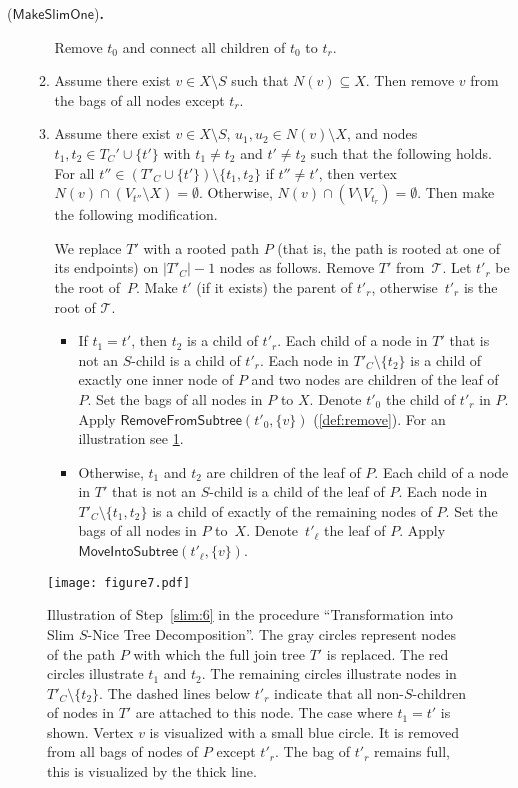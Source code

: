 \documentclass[a4paper,UKenglish,cleveref, autoref, thm-restate, numberwithinsect]{lipics-v2021}
\newcounter{modification}
\newenvironment{modification}[1][]{\refstepcounter{modification}\renewcommand{\arraystretch}{.6}
\begin{center}
\begin{mdframed}[nobreak=true]{\normalsize\sffamily{\bfseries Modification~\themodification} (#1){\bfseries .}}

\vspace{.5ex}
\begin{normalsize}
}
{
\end{normalsize}
\end{mdframed}
\end{center}
}
\newcommand{\MoveIntoSubtree}{\mathsf{MoveIntoSubtree}}
\newcommand{\RemoveFromSubtree}{\mathsf{RemoveFromSubtree}}
\newcommand{\MakeSlim}{\mathsf{MakeSlimOne}}
\begin{document}
\begin{modification}[$\MakeSlim$]
\begin{enumerate}
\begin{enumerate}
Remove $t_0$ and connect all children of $t_0$ to $t_r$.
\label{slim:6a}
\item Assume there exist $v\in X\setminus S$ such that $N(v)\subseteq X$. Then remove $v$ from the bags of all nodes except $t_r$.\label{slim:6aa}
\item Assume there exist $v\in X\setminus S$, $u_1,u_2\in N(v)\setminus X$, and nodes $t_1,t_2\in T_C'\cup\{t'\}$ with $t_1\neq t_2$ and $t'\neq t_2$ such that the following holds.
For all $t''\in (T'_C\cup\{t'\})\setminus\{t_1,t_2\}$ if $t''\neq t'$, then vertex $N(v)\cap (V_{t''}\setminus X)=\emptyset$. Otherwise, $N(v)\cap  (V\setminus V_{t_r})=\emptyset$. 
Then make the following modification. 


We replace $T'$ with a rooted path $P$ (that is, the path is rooted at one of its endpoints) on $|T'_C|-1$ nodes as follows. Remove $T'$ from~$\mathcal{T}$. Let $t'_r$ be the root of~$P$. Make $t'$ (if it exists) the parent of $t'_r$, otherwise~$t'_r$ is the root of $\mathcal{T}$.  
\begin{itemize}
\item If $t_1=t'$, then $t_2$ is a child of $t'_r$. Each child of a node in $T'$ that is not an $S$-child is a child of $t'_r$. Each node in $T'_C\setminus\{t_2\}$ is a child of exactly one inner node of $P$ and two nodes are children of the leaf of~$P$. Set the bags of all nodes in $P$ to $X$. 
Denote $t'_0$ the child of $t'_r$ in $P$.
Apply $\RemoveFromSubtree(t'_0,\{v\})$ (\cref{def:remove}). For an illustration see \cref{fig:fulljointree}.

\item Otherwise, $t_1$ and $t_2$ are children of the leaf of $P$. Each child of a node in $T'$ that is not an $S$-child is a child of the leaf of $P$. Each node in $T'_C\setminus\{t_1,t_2\}$ is a child of exactly of the remaining nodes of $P$. Set the bags of all nodes in $P$ to~$X$. 
Denote~$t'_\ell$ the leaf of $P$. 
Apply $\MoveIntoSubtree(t'_\ell,\{v\})$.
\end{itemize}
\label{slim:6b}
\end{enumerate}\end{enumerate}
\end{modification}



\begin{figure}[t]
\centering
\texttt{[image: figure7.pdf]}
    \caption{Illustration of Step~\ref{slim:6} in the procedure ``Transformation into Slim $S$-Nice Tree Decomposition''. The gray circles represent nodes of the path $P$ with which the full join tree $T'$ is replaced. The red circles illustrate $t_1$ and $t_2$. The remaining circles illustrate nodes in $T'_C\setminus\{t_2\}$. The dashed lines below $t'_r$ indicate that all non-$S$-children of nodes in $T'$ are attached to this node. The case where $t_1=t'$ is shown. Vertex $v$ is visualized with a small blue circle. It is removed from all bags of nodes of $P$ except $t'_r$. The bag of $t'_r$ remains full, this is visualized by the thick line.}\label{fig:fulljointree}
\end{figure}
\end{document}
